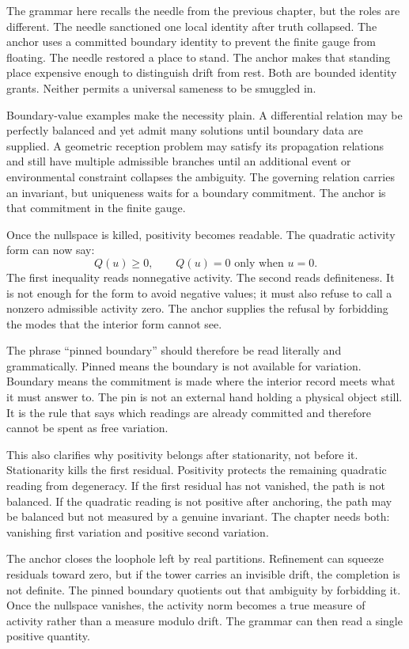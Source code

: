 The grammar here recalls the needle from the previous chapter, but the
roles are different. The needle sanctioned one local identity after truth
collapsed. The anchor uses a committed boundary identity to prevent the
finite gauge from floating. The needle restored a place to stand. The
anchor makes that standing place expensive enough to distinguish drift from
rest. Both are bounded identity grants. Neither permits a universal sameness
to be smuggled in.

Boundary-value examples make the necessity plain. A differential relation
may be perfectly balanced and yet admit many solutions until boundary data
are supplied. A geometric reception problem may satisfy its propagation
relations and still have multiple admissible branches until an additional
event or environmental constraint collapses the ambiguity. The governing
relation carries an invariant, but uniqueness waits for a boundary
commitment. The anchor is that commitment in the finite gauge.

Once the nullspace is killed, positivity becomes readable. The quadratic
activity form can now say:
\[
  Q(u) \geq 0,
  \qquad Q(u)=0 \text{ only when } u=0 .
\]
The first inequality reads nonnegative activity. The second reads
definiteness. It is not enough for the form to avoid negative values; it
must also refuse to call a nonzero admissible activity zero. The anchor
supplies the refusal by forbidding the modes that the interior form cannot
see.

The phrase ``pinned boundary'' should therefore be read literally and
grammatically. Pinned means the boundary is not available for variation.
Boundary means the commitment is made where the interior record meets what
it must answer to. The pin is not an external hand holding a physical object
still. It is the rule that says which readings are already committed and
therefore cannot be spent as free variation.

This also clarifies why positivity belongs after stationarity, not before
it. Stationarity kills the first residual. Positivity protects the remaining
quadratic reading from degeneracy. If the first residual has not vanished,
the path is not balanced. If the quadratic reading is not positive after
anchoring, the path may be balanced but not measured by a genuine invariant.
The chapter needs both: vanishing first variation and positive second
variation.

The anchor closes the loophole left by real partitions. Refinement can
squeeze residuals toward zero, but if the tower carries an invisible drift,
the completion is not definite. The pinned boundary quotients out that
ambiguity by forbidding it. Once the nullspace vanishes, the activity norm
becomes a true measure of activity rather than a measure modulo drift. The
grammar can then read a single positive quantity.


